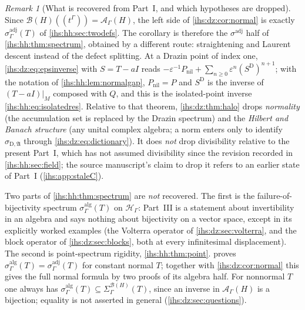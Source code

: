 \documentclass[11pt,a4paper]{article}
\numberwithin{equation}{section}
\theoremstyle{definition}
\theoremstyle{remark}
\newtheorem{remark}[remark]{Remark}
\newcommand{\Hil}{\mathcal H_\Gamma}
\newcommand{\B}{\mathcal B(H)}
\newcommand{\Ahh}{\mathcal A_\Gamma(H)}
\newcommand{\eps}{\varepsilon}
\newcommand{\Alg}{\mathfrak A}
\newcommand{\sigD}{\sigma_{\mathrm D,\Alg}}
\begin{document}
\begin{remark}[What is recovered from Part~I, and which hypotheses are dropped]\label{ihs:dz:rem:recover}
Since $\B((t^\Gamma))=\Ahh$, the left side of \cref{ihs:dz:cor:normal} is
exactly $\sigma^{\mathrm{adj}}_\Gamma(T)$ of \cref{ihs:hh:sec:twodefs}.
The corollary is therefore the $\sigma^{\mathrm{adj}}$ half of
\cref{ihs:hh:thm:spectrum}, obtained by a different route: straightening and
Laurent descent instead of the defect splitting. At a Drazin point of index
one, \eqref{ihs:dz:eq:epsinverse} with $S=T-aI$ reads
$-\eps^{-1}P_{\mathrm{nil}}+\sum_{n\ge0}\eps^n(S^{\mathrm D})^{n+1}$; with
the notation of \cref{ihs:hh:lem:normalgap}, $P_{\mathrm{nil}}=P$ and
$S^{\mathrm D}$ is the inverse of $(T-aI)|_M$ composed with $Q$, and this is
the isolated-point inverse \eqref{ihs:hh:eq:isolatedres}. Relative to that theorem,
\cref{ihs:dz:thm:halo} drops \emph{normality} (the accumulation set is
replaced by the Drazin spectrum) and the \emph{Hilbert and Banach structure}
(any unital complex algebra; a norm enters only to identify $\sigD$ through
\eqref{ihs:dz:eq:dictionary}). It does \emph{not} drop divisibility relative
to the present Part~I, which has not assumed divisibility since the revision
recorded in \cref{ihs:hh:sec:field}; the source manuscript's claim to drop it
refers to an earlier state of Part~I (\cref{ihs:app:staleC}).

Two parts of \cref{ihs:hh:thm:spectrum} are \emph{not} recovered. The first
is the failure-of-bijectivity spectrum $\sigma^{\mathrm{alg}}_\Gamma(T)$ on
$\Hil$: Part~III is a statement about invertibility in an algebra and says
nothing about bijectivity on a vector space, except in its explicitly worked
examples (the Volterra operator of \cref{ihs:dz:sec:volterra}, and the block
operator of \cref{ihs:dz:sec:blocks}, both at every infinitesimal
displacement). The second is point-spectrum rigidity,
\cref{ihs:hh:thm:point}.  proves
$\sigma^{\mathrm{alg}}_\Gamma(T)=\sigma^{\mathrm{adj}}_\Gamma(T)$ for
constant normal $T$; together with \cref{ihs:dz:cor:normal} this gives the
full normal formula by two proofs of its algebra half. For nonnormal $T$ one
always has $\sigma^{\mathrm{alg}}_\Gamma(T)\subseteq
\Sigma^{\B}_\Gamma(T)$, since an inverse in $\Ahh$ is a bijection; equality is
not asserted in general (\cref{ihs:dz:sec:questions}).
\end{remark}
\end{document}

